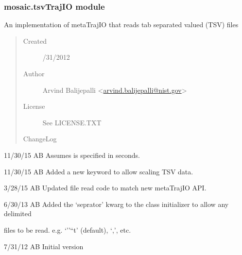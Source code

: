 \documentclass[letterpaper,10pt,english]{sphinxmanual}
\begin{document}
\subsubsection{mosaic.tsvTrajIO module}
\label{api-doc/mosaic.traj:mosaic-tsvtrajio-module}\label{api-doc/mosaic.traj:module-mosaic.tsvTrajIO}
An implementation of metaTrajIO that reads tab separated valued (TSV) files
\begin{quote}\begin{description}
\item[{Created}] /31/2012

\item[{Author}] \leavevmode
Arvind Balijepalli \textless{}\href{mailto:arvind.balijepalli@nist.gov}{arvind.balijepalli@nist.gov}\textgreater{}

\item[{License}] \leavevmode
See LICENSE.TXT

\item[{ChangeLog}] \leavevmode
\end{description}\end{quote}

\begin{DUlineblock}{0em}
\item[] 11/30/15        AB      Assumes  is specified in seconds.
\item[] 11/30/15        AB      Added a new keyword  to allow scaling TSV data.
\item[] 3/28/15         AB      Updated file read code to match new metaTrajIO API.
\item[] 6/30/13         AB      Added the `seprator' kwarg to the class initializer to allow any delimited
\item[]
\begin{DUlineblock}{\DUlineblockindent}
\item[] files to be read. e.g. `''``t' (default), `,', etc.
\end{DUlineblock}
\item[] 7/31/12         AB      Initial version
\end{DUlineblock}
\end{document}
